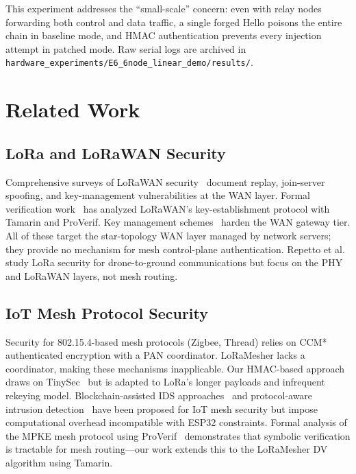 \documentclass[10pt,journal,compsoc]{IEEEtran}
\begin{document}
This experiment addresses the ``small-scale'' concern:
even with relay nodes forwarding both control and data traffic,
a single forged Hello poisons the entire chain in baseline mode,
and HMAC authentication prevents every injection attempt in
patched mode.
Raw serial logs are archived in
\texttt{hardware\_experiments/E6\_6node\_linear\_demo/results/}.

\section{Related Work}
\label{sec:related}

\subsection{LoRa and LoRaWAN Security}

Comprehensive surveys of LoRaWAN security~\cite{hessel2022-lorawan-survey,yang2021-lorawan-systematic}
document replay, join-server spoofing, and key-management vulnerabilities
at the WAN layer.
Formal verification work~\cite{ieee2025-lorawan-key-vulnerability,
ieee2025-lorawan-key-verification} has analyzed LoRaWAN's key-establishment
protocol with Tamarin and ProVerif. Key management schemes~\cite{lorawan-key-mgmt-2023,
mohamed2022-lorawan-gateways} harden the WAN gateway tier.
All of these target the star-topology WAN layer managed by network
servers; they provide no mechanism for mesh control-plane authentication.
Repetto et al.~\cite{repetto2025-lorawan-drone-attack} study LoRa
security for drone-to-ground communications but focus on the PHY
and LoRaWAN layers, not mesh routing.

\subsection{IoT Mesh Protocol Security}

Security for 802.15.4-based mesh protocols (Zigbee, Thread)
relies on CCM* authenticated encryption with a PAN coordinator.
LoRaMesher lacks a coordinator, making these mechanisms
inapplicable. Our HMAC-based approach draws on TinySec~\cite{shelby2026-zero-trust-iot}
but is adapted to LoRa's longer payloads and infrequent rekeying
model. Blockchain-assisted IDS approaches~\cite{springer2026-blockchain-ids}
and protocol-aware intrusion detection~\cite{bringye2026-lorawan-ids,ieee2025-lorawan-jamming-ids}
have been proposed for IoT mesh security but impose
computational overhead incompatible with ESP32 constraints.
Formal analysis of the MPKE mesh protocol using
ProVerif~\cite{ieee2025-mpke-proverif} demonstrates that
symbolic verification is tractable for mesh routing—our work
extends this to the LoRaMesher DV algorithm using Tamarin.
\end{document}
